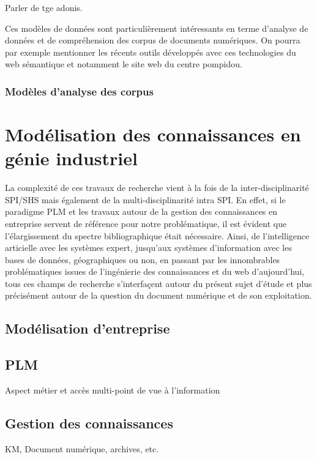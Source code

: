 \documentclass[a4paper,11pt,french]{article}
\begin{document}
Parler de tge adonis.

Ces modèles de données sont particulièrement intéressants en terme d'analyse de données et de compréhension des corpus de documents numériques. On pourra par exemple mentionner les récents outils développés avec ces technologies du web sémantique et notamment le site web du centre pompidou.

\subsubsection{Modèles d'analyse des corpus}

\section{Modélisation des connaissances en génie industriel}

La complexité de ces travaux de recherche vient à la fois de la inter-disciplinarité SPI/SHS mais également de la multi-disciplinarité intra SPI. En effet, si le paradigme PLM et les travaux autour de la gestion des connaissances en entreprise servent de référence pour notre problématique, il est évident que l'élargissement du spectre bibliographique était nécessaire. Ainsi, de l'intelligence articielle avec les systèmes expert, jusqu'aux systèmes d'information avec les bases de données, géographiques ou non, en passant par les innombrables problématiques issues de l'ingénierie des connaissances et du web d'aujourd'hui, tous ces champs de recherche s'interfaçent autour du présent sujet d'étude et plus précisément autour de la question du document numérique et de son exploitation.

\subsection{Modélisation d'entreprise}

\subsection{PLM}
Aspect métier et accès multi-point de vue à l'information

\subsection{Gestion des connaissances}
KM, Document numérique, archives, etc.
\end{document}
